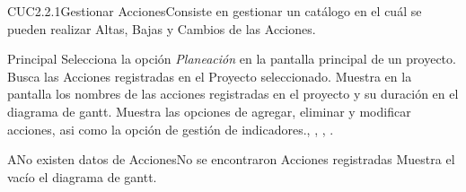 	\begin{UseCase}{CUC2.2.1}{Gestionar Acciones}{Consiste en gestionar un catálogo en el cuál se pueden realizar Altas, Bajas y Cambios de las Acciones.}
	\end{UseCase}
	
		
	\begin{UCtrayectoria}{Principal}
		\UCpaso[\UCactor] Selecciona la opción \textit{Planeación} en la pantalla principal de un proyecto.
		\UCpaso Busca las Acciones registradas en el Proyecto seleccionado. \label{paso:CUC13buscarAcciones}
		\UCpaso Muestra en la pantalla  los nombres de las acciones registradas en el proyecto y su duración en el diagrama de gantt.
		\UCpaso Muestra las opciones de agregar, eliminar y modificar acciones, asi como la opción de gestión de indicadores., , , .
	\end{UCtrayectoria}
	
	\begin{UCtrayectoriaA}{A}{No existen datos de Acciones}{No se encontraron Acciones registradas}
			\UCpaso Muestra el vacío el diagrama de gantt.
	\end{UCtrayectoriaA}

